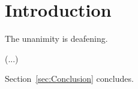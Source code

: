 %
\section{Introduction}\label{sec:Introduction}

\noindent The unanimity is deafening.

(...)

Section~\ref{sec:Conclusion} concludes.

\bigskip
%
